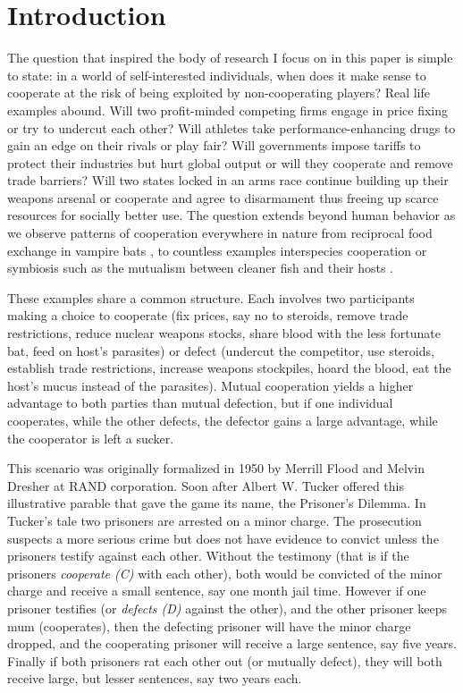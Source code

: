 \chapter{Introduction}
The question that inspired the body of research I focus on in this paper is simple to state: in a world of self-interested individuals, when does it make sense to cooperate at the risk of being exploited by non-cooperating players? Real life examples abound. Will two profit-minded competing firms engage in price fixing or try to undercut each other? Will athletes take performance-enhancing drugs to gain an edge on their rivals or play fair? Will governments impose tariffs to protect their industries but hurt global output or will they cooperate and remove trade barriers? Will two states locked in an arms race continue building up their weapons arsenal or cooperate and agree to disarmament thus freeing up scarce resources for socially better use.
The question extends beyond human behavior as we observe patterns of cooperation everywhere in nature from reciprocal food exchange in vampire bats \cite{Wilkinson_1984}, to countless examples interspecies cooperation or symbiosis such as the mutualism between cleaner fish and their hosts \cite{Bshary_2002}.

These examples share a common structure. Each involves two participants making a choice to cooperate (fix prices, say no to steroids, remove trade restrictions, reduce nuclear weapons stocks, share blood with the less fortunate bat, feed on host's parasites) or defect (undercut the competitor, use steroids, establish trade restrictions, increase weapons stockpiles, hoard the blood, eat the host's mucus instead of the parasites). Mutual cooperation yields a higher advantage to both parties than mutual defection, but if one individual cooperates, while the other defects, the defector gains a large advantage, while the cooperator is left a sucker.

This scenario was originally formalized in 1950 by Merrill Flood and Melvin Dresher at RAND corporation. Soon after Albert W. Tucker offered this illustrative parable that gave the game its name, the Prisoner's Dilemma. In Tucker's tale two prisoners are arrested on a minor charge. The prosecution suspects a more serious crime but does not have evidence to convict unless the prisoners testify against each other. Without the testimony (that is if the prisoners \textit{cooperate (C)} with each other), both would be convicted of the minor charge and receive a small sentence, say one month jail time. However if one prisoner testifies (or \textit{defects (D)} against the other), and the other prisoner keeps mum (cooperates), then the defecting prisoner will have the minor charge dropped, and the cooperating prisoner will receive a large sentence, say five years. Finally if both prisoners rat each other out (or mutually defect), they will both receive large, but lesser sentences, say two years each.



